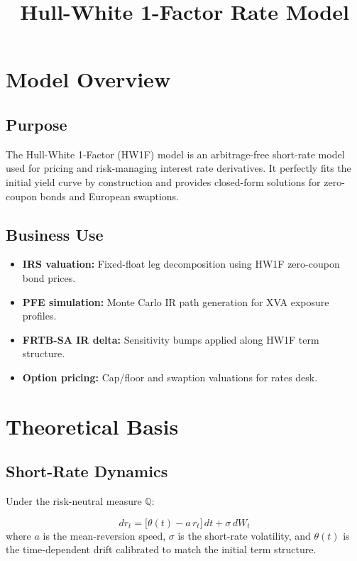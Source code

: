 \documentclass{apex_mdd}
\title{Hull-White 1-Factor Rate Model}
\begin{document}
\maketitle
\statusbadge

\tableofcontents
\newpage

\section{Model Overview}

\subsection{Purpose}
The Hull-White 1-Factor (HW1F) model is an arbitrage-free short-rate model used for pricing and risk-managing interest rate derivatives. It perfectly fits the initial yield curve by construction and provides closed-form solutions for zero-coupon bonds and European swaptions.

\subsection{Business Use}
\begin{itemize}
  \item \textbf{IRS valuation:} Fixed-float leg decomposition using HW1F zero-coupon bond prices.
  \item \textbf{PFE simulation:} Monte Carlo IR path generation for XVA exposure profiles.
  \item \textbf{FRTB-SA IR delta:} Sensitivity bumps applied along HW1F term structure.
  \item \textbf{Option pricing:} Cap/floor and swaption valuations for rates desk.
\end{itemize}

\section{Theoretical Basis}

\subsection{Short-Rate Dynamics}
Under the risk-neutral measure $\mathbb{Q}$:
\begin{formulabox}
\[
  dr_t = \bigl[\theta(t) - a\,r_t\bigr]\,dt + \sigma\,dW_t
\]
where $a$ is the mean-reversion speed, $\sigma$ is the short-rate volatility, and $\theta(t)$ is the time-dependent drift calibrated to match the initial term structure.
\end{formulabox}
\end{document}
